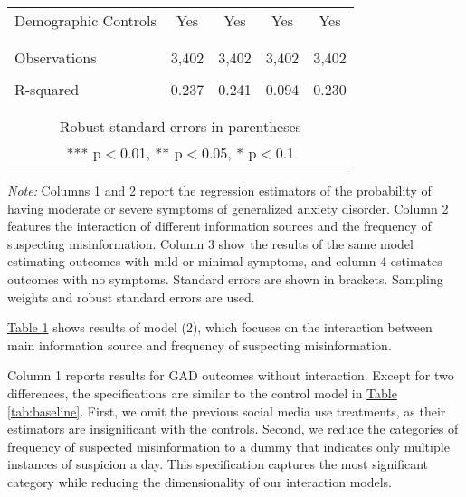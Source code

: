 \documentclass{article}[12pt]
\begin{document}
\begin{table}[h!]
{\begin{tabular}{lcccc}
                     \\
                    Demographic Controls & Yes & Yes & Yes & Yes \\
                     \\\\
                    Observations & 3,402 & 3,402 & 3,402 & 3,402 \\
                     \\
                     R-squared & 0.237 & 0.241 & 0.094 & 0.230 \\\\ \hline \\
                    \multicolumn{5}{c}{ Robust standard errors in parentheses} \\
                    \multicolumn{5}{c}{ *** p$<$0.01, ** p$<$0.05, * p$<$0.1} \\
                    \end{tabular}
                }
            \endgroup
            
            \begin{tablenotes}[flushleft]
                \item
                \textit{Note:} Columns 1 and 2 report the regression estimators of the probability of having moderate or severe symptoms of generalized anxiety disorder. Column 2 features the interaction of different information sources and the frequency of suspecting misinformation. Column 3 show the results of the same model estimating outcomes with mild or minimal symptoms, and column 4 estimates outcomes with no symptoms. Standard errors are shown in brackets. Sampling weights and robust standard errors are used.
            \end{tablenotes}
            
            \label{tab:interaction}
            
        \end{table}
        
        \hyperref[tab:interaction]{Table \ref{tab:interaction}} shows results of model (2), which focuses on the interaction between main information source and frequency of suspecting misinformation.
        
        Column 1 reports results for GAD outcomes without interaction. Except for two differences, the specifications are similar to the control model in \hyperref[tab:baseline]{Table \ref{tab:baseline}}. First, we omit the previous social media use treatments, as their estimators are insignificant with the controls. Second, we reduce the categories of frequency of suspected misinformation to a dummy that indicates only multiple instances of suspicion a day. This specification captures the most significant category while reducing the dimensionality of our interaction models.
        
\end{document}
